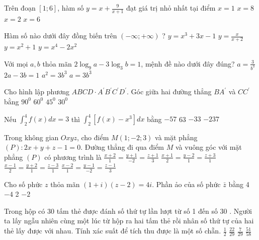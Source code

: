 \begin{ex} 
 Trên đoạn $[1 ; 6]$, hàm số $y=x+\frac{9}{x+1}$ đạt giá trị nhỏ nhất tại điểm
\choice 
 { $x=1$} 
 { $x=8$} 
 { $x=2$} 
 { $x=6$}
\end{ex} 
 
\begin{ex} 
 Hàm số nào dưới đây đồng biến trên $(-\infty ;+\infty)$ ? 
 \choice 
{ $y=x^{3}+3 x-1$} 
 { $y=\frac{x}{x+2}$}
{ $y=x^{2}+1$} 
 { $y=x^{4}-2 x^{2}$}
\end{ex} 
 
\begin{ex} 
 Với mọi $a, b$ thỏa mãn $2 \log _{9} a-3 \log _{3} b=1$, mệnh đề nào dưới đây đúng?
\choice 
 { $a=\frac{3}{b^{3}}$} 
 { $2 a-3 b=1$} 
 { $a^{2}=3 b^{3}$} 
 { $a=3 b^{3}$}
\end{ex} 
 
\begin{ex} 
 Cho hình lập phương $A B C D \cdot A^{\prime} B^{\prime} C^{\prime} D^{\prime}$. Góc giữa hai đường thẳng $B A^{\prime}$ và $C C^{\prime}$ bằng
\choice 
 { $90^{0}$} 
 { $60^{0}$} 
 { $45^{0}$} 
 { $30^{0}$}
\end{ex} 
 
\begin{ex} 
 Nếu $\int_{2}^{4} f(x) d x=3$ thì $\int_{2}^{4}\left[f(x)-x^{3}\right] d x$ bằng
\choice 
 { $-57$} 
 { 63 } 
 { $-33$} 
 { $-237$}
\end{ex} 
 
\begin{ex} 
 Trong không gian $O x y z$, cho điểm $M(1 ;-2 ; 3)$ và mặt phẳng $(P): 2 x+y+z-1=0$. Đường thẳng đi qua điểm $M$ và vuông góc với mặt phẳng $(P)$ có phương trình là
 \choice
{ $\frac{x+2}{1}=\frac{y+1}{-2}=\frac{z+1}{3}$}
 { $\frac{x+1}{2}=\frac{y-2}{1}=\frac{z+3}{1}$} 
 { $\frac{x-1}{2}=\frac{y+2}{1}=\frac{z-3}{1}$} 
 { $\frac{x-2}{1}=\frac{y-1}{-2}=\frac{z-1}{3}$}
\end{ex} 
 
\begin{ex} 
 Cho số phức $z$ thỏa mãn $(1+i)(z-2)=4 i$. Phần ảo của số phức $\bar{z}$ bằng
\choice 
 { 4 } 
 { $-4$} 
 { 2 } 
 { $-2$}
\end{ex} 
 
 
\begin{ex} 
 Trong hộp có 30 tấm thẻ được đánh số thứ tự lần lượt từ số 1 đến số 30 . Người ta lấy ngẫu nhiên cùng một lúc từ hộp ra hai tấm thẻ rồi nhân số thứ tự của hai thẻ lấy được với nhau. Tính xác suất để tích thu được là một số chẵn.
\choice 
 { $\frac{1}{2}$} 
 { $\frac{22}{29}$} 
 { $\frac{7}{29}$} 
 { $\frac{51}{58}$}
\end{ex} 
 
